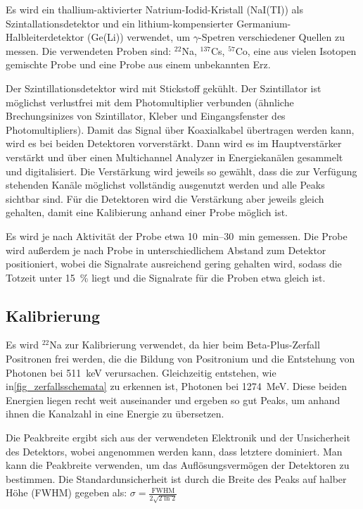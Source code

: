 \documentclass[
	a4paper,
	12pt,
	pagesize,
	ngerman
]{scrartcl}
\begin{document}
	Es wird ein thallium-aktivierter Natrium-Iodid-Kristall (NaI(TI)) als Szintallationsdetektor und  ein lithium-kompensierter Germanium-Halbleiterdetektor (Ge(Li)) verwendet, um $\gamma$-Spetren verschiedener Quellen zu messen.
	Die verwendeten Proben sind: $^22$Na, $^137$Cs, $^57$Co, eine aus vielen Isotopen gemischte Probe und eine Probe aus einem unbekannten Erz.

	Der Szintillationsdetektor wird mit Stickstoff gekühlt.
	Der Szintillator ist möglichst verlustfrei mit dem Photomultiplier verbunden (ähnliche Brechungsinizes von Szintillator, Kleber und Eingangsfenster des Photomultipliers).
	Damit das Signal über Koaxialkabel übertragen werden kann, wird es bei beiden Detektoren vorverstärkt.
	Dann wird es im Hauptverstärker verstärkt und über einen Multichannel Analyzer in Energiekanälen gesammelt und digitalisiert.
	Die Verstärkung wird jeweils so gewählt, dass die zur Verfügung stehenden Kanäle möglichst vollständig ausgenutzt werden und alle Peaks sichtbar sind.
	Für die Detektoren wird die Verstärkung aber jeweils gleich gehalten, damit eine Kalibierung anhand einer Probe möglich ist.

	Es wird je nach Aktivität der Probe etwa \SIrange{10}{30}{\minute} gemessen.
	Die Probe wird außerdem je nach Probe in unterschiedlichem Abstand zum Detektor positioniert, wobei die Signalrate ausreichend gering gehalten wird, sodass die Totzeit unter \SI{15}{\percent} liegt und die Signalrate für die Proben etwa gleich ist.

	\subsection{Kalibrierung}

	Es wird $^{22}$Na zur Kalibrierung verwendet, da hier beim Beta-Plus-Zerfall Positronen frei werden, die die Bildung von Positronium und die Entstehung von Photonen bei \SI{511}{keV} verursachen.
	Gleichzeitig entstehen, wie in\cref{fig_zerfallsschemata} zu erkennen ist, Photonen bei \SI{1274}{MeV}.
	Diese beiden Energien liegen recht weit auseinander und ergeben so gut Peaks, um anhand ihnen die Kanalzahl in eine Energie zu übersetzen.

	Die Peakbreite ergibt sich aus der verwendeten Elektronik und der Unsicherheit des Detektors, wobei angenommen werden kann, dass letztere dominiert.
	Man kann die Peakbreite verwenden, um das Auflösungsvermögen der Detektoren zu bestimmen.
	Die Standardunsicherheit ist durch die Breite des Peaks auf halber Höhe (FWHM) gegeben als: $\sigma = \frac{\text{FWHM}}{2\sqrt{2 \ln 2}}$
\end{document}
